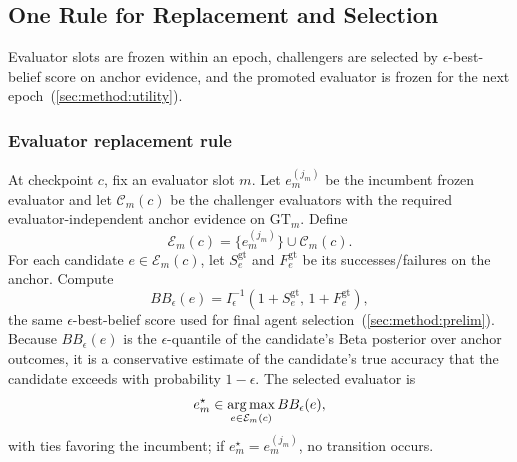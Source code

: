 \subsection{One Rule for Replacement and Selection}
\label{app:controlled_utility_details}

Evaluator slots are frozen within an epoch, challengers are selected by $\epsilon$-best-belief score on anchor evidence, and the promoted evaluator is frozen for the next epoch~(\cref{sec:method:utility}).

\subsubsection{Evaluator replacement rule}
\label{app:swap-rule}

At checkpoint $c$, fix an evaluator slot $m$. Let $e_m^{(j_m)}$ be the incumbent frozen evaluator and let $\mathcal C_m(c)$ be the challenger evaluators with the required evaluator-independent anchor evidence on $\mathrm{GT}_m$. Define
\[
\mathcal E_m(c)
=
\{e_m^{(j_m)}\}\cup\mathcal C_m(c).
\]
For each candidate $e\in\mathcal E_m(c)$, let $S^{\mathrm{gt}}_e$ and $F^{\mathrm{gt}}_e$ be its successes/failures on the anchor. Compute
\[
BB_\epsilon(e)
=
I^{-1}_{\epsilon}\!\left(1+S^{\mathrm{gt}}_e,\,1+F^{\mathrm{gt}}_e\right),
\]
the same $\epsilon$-best-belief score used for final agent selection~(\cref{sec:method:prelim}). Because $BB_\epsilon(e)$ is the $\epsilon$-quantile of the candidate's Beta posterior over anchor outcomes, it is a conservative estimate of the candidate's true accuracy that the candidate exceeds with probability $1-\epsilon$. The selected evaluator is
\[
e_m^\star
\in
\operatorname*{arg\,max}_{e\in\mathcal E_m(c)} BB_\epsilon(e),
\]
with ties favoring the incumbent; if $e_m^\star=e_m^{(j_m)}$, no transition occurs.
